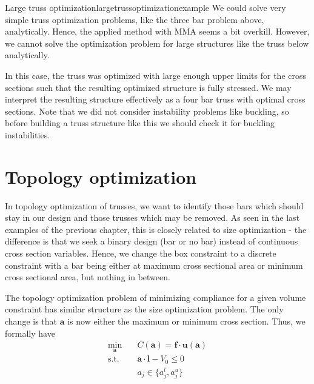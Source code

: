 \begin{example}{Large truss optimization}{largetrussoptimizationexample} 
    We could solve very simple truss optimization problems, like the three bar problem above, analytically. Hence, the applied method with MMA seems a bit overkill. 
    However, we cannot solve the optimization problem for large structures like the truss below analytically. 

    \begin{center}
         
    \end{center}

    In this case, the truss was optimized with large enough upper limits for the cross sections such that the resulting optimized structure is fully stressed. We may interpret the resulting structure effectively as a four bar truss with optimal cross sections. Note that we did not consider instability problems like buckling, so before building a truss structure like this we should check it for buckling instabilities.

    \begin{center}
         
    \end{center}
\end{example}

\section{Topology optimization}
\label{sec:truss_topology}
In topology optimization of trusses, we want to identify those bars which should stay in our design and those trusses which may be removed. As seen in the last examples of the previous chapter, this is closely related to size optimization - the difference is that we seek a binary design (bar or no bar) instead of continuous cross section variables. Hence, we change the box constraint to a discrete constraint with a bar being either at maximum cross sectional area or minimum cross sectional area, but nothing in between.

The topology optimization problem of minimizing compliance for a given volume constraint has similar structure as the size optimization problem. The only change is that $\mathbf{a}$ is now either the maximum or minimum cross section. Thus, we formally have 
\begin{equation}
    \begin{aligned}
        \min_{\mathbf{a}} \quad & C(\mathbf{a}) = \mathbf{f} \cdot \mathbf{u}(\mathbf{a})\\
        \textrm{s.t.} \quad & \mathbf{a} \cdot \mathbf{l} - V_0 \le 0  \\
                            & a_j \in \{a_j^l, a_j^u\}\\
    \end{aligned}
\end{equation}

